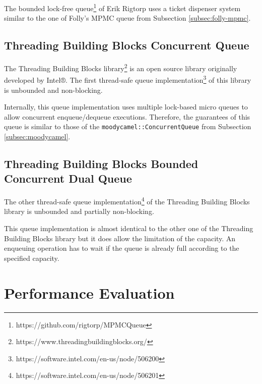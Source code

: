 	The bounded lock-free queue\footnote{https://github.com/rigtorp/MPMCQueue} of Erik Rigtorp uses a ticket dispenser system similar to the one of Folly's MPMC queue from Subsection \ref{subsec:folly-mpmc}.

\subsection[TBB Concurrent Queue]{Threading Building Blocks Concurrent Queue} \label{subsec:intel-bounded}%

	The Threading Building Blocks library\footnote{https://www.threadingbuildingblocks.org/} is an open source library originally developed by Intel®. The first thread-safe queue implementation\footnote{https://software.intel.com/en-us/node/506200} of this library is unbounded and non-blocking.
	
	Internally, this queue implementation uses multiple lock-based micro queues to allow concurrent enqueue/dequeue executions. Therefore, the guarantees of this queue is similar to those of the \lstinline{moodycamel::ConcurrentQueue} from Subsection \ref{subsec:moodycamel}.

\subsection[TBB Bounded Concurrent Queue]{Threading Building Blocks Bounded Concurrent Dual Queue} \label{subsec:intel-unbounded}%

	The other thread-safe queue implementation\footnote{https://software.intel.com/en-us/node/506201} of the Threading Building Blocks library is unbounded and partially non-blocking.
	
	This queue implementation is almost identical to the other one of the Threading Building Blocks library but it does allow the limitation of the capacity. An enqueuing operation has to wait if the queue is already full according to the specified capacity.

\section[Performance Evaluation]{Performance Evaluation} \label{sec:free-list-performance}
